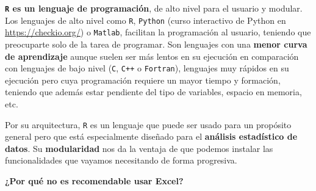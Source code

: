 \documentclass[11pt,]{book}
\begin{document}
\textbf{\texttt{R} es un lenguaje de programación}, de alto nivel para el usuario y modular. Los lenguajes de alto nivel como \texttt{R}, \texttt{Python} (curso interactivo de Python en \url{https://checkio.org/}) o \texttt{Matlab}, facilitan la programación al usuario, teniendo que preocuparte solo de la tarea de programar. Son lenguajes con una \textbf{menor curva de aprendizaje} aunque suelen ser más lentos en su ejecución en comparación con lenguajes de bajo nivel (\texttt{C}, \texttt{C++} o \texttt{Fortran}), lenguajes muy rápidos en su ejecución pero cuya programación requiere un mayor tiempo y formación, teniendo que además estar pendiente del tipo de variables, espacio en memoria, etc.

Por su arquitectura, \texttt{R} es un lenguaje que puede ser usado para un propósito general pero que está especialmente diseñado para el \textbf{análisis estadístico de datos}. Su \textbf{modularidad} nos da la ventaja de que podemos instalar las funcionalidades que vayamos necesitando de forma progresiva.

\textbf{¿Por qué no es recomendable usar Excel?}
\end{document}
